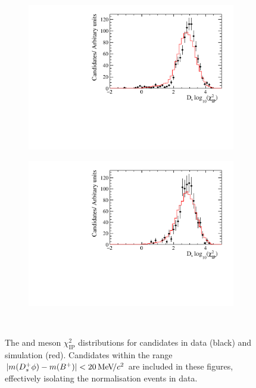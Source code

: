 \begin{figure}[!h]
\begin{subfigure}[t]{0.32\textwidth}
      \includegraphics[width=1.0\textwidth]{figs/Selection/Data_MC_Comparison_Var_2_B2DsD0_Ds2PiPiPi.pdf}
      \caption{\decay{\Dsp}{\pip\pim\pip}}
   \end{subfigure}
   \begin{subfigure}[t]{0.32\textwidth}
      \centering
      \includegraphics[width=1.0\textwidth]{figs/Selection/Data_MC_Comparison_Var_2_B2DsD0_Ds2KPiPi.pdf}
      \caption{\decay{\Dsp}{\Kp\pim\pip}}
   \end{subfigure}\\
   \caption{The \Bp and \Dsp meson $\chi^{2}_{\text{IP}}$ distributions for \decay{\Bp}{\Dsp\Dzb} candidates in data (black) and simulation (red). Candidates within the range $|m({{D}^+_{s}}\phi) - m({{{B}^+}})| < 20 {\mathrm{\,Me\kern -0.1em V\!/}c^2}$ are included in these figures, effectively isolating the normalisation events in data.}
   \label{fig:ipchi2dist_normalisation}   
\end{figure}



